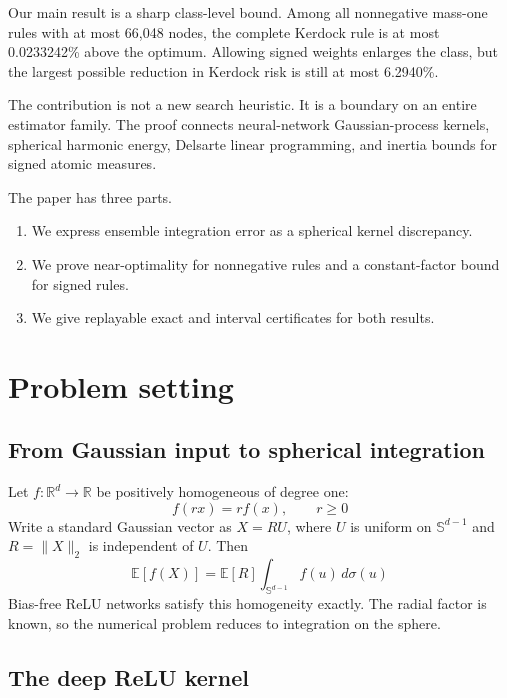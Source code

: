 \documentclass[11pt]{article}
\providecommand{\tightlist}{%
  \setlength{\itemsep}{0pt}\setlength{\parskip}{0pt}}
\begin{document}
Our main result is a sharp class-level bound. Among all nonnegative
mass-one rules with at most 66,048 nodes, the complete Kerdock rule is
at most 0.0233242\% above the optimum. Allowing signed weights enlarges
the class, but the largest possible reduction in Kerdock risk is still
at most 6.2940\%.

The contribution is not a new search heuristic. It is a boundary on an
entire estimator family. The proof connects neural-network
Gaussian-process kernels, spherical harmonic energy, Delsarte linear
programming, and inertia bounds for signed atomic measures.

The paper has three parts.

\begin{enumerate}
\def\labelenumi{\arabic{enumi}.}
\tightlist
\item
  We express ensemble integration error as a spherical kernel
  discrepancy.
\item
  We prove near-optimality for nonnegative rules and a constant-factor
  bound for signed rules.
\item
  We give replayable exact and interval certificates for both results.
\end{enumerate}

\section{Problem setting}\label{problem-setting}

\subsection{From Gaussian input to spherical
integration}\label{from-gaussian-input-to-spherical-integration}

Let \(f:\mathbb{R}^d\to\mathbb{R}\) be positively homogeneous of degree
one: \[
f(rx)=r f(x), \qquad r\geq 0
\] Write a standard Gaussian vector as \(X=RU\), where \(U\) is uniform
on \(\mathbb{S}^{d-1}\) and \(R=\lVert X\rVert_2\) is independent of
\(U\). Then \[
\mathbb{E}[f(X)]
=\mathbb{E}[R]\int_{\mathbb{S}^{d-1}} f(u)\,d\sigma(u)
\] Bias-free ReLU networks satisfy this homogeneity exactly. The radial
factor is known, so the numerical problem reduces to integration on the
sphere.

\subsection{The deep ReLU kernel}\label{the-deep-relu-kernel}
\end{document}
